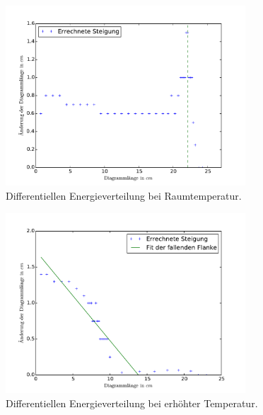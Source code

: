 \begin{figure}[p!]
	\centering
	\includegraphics[width=0.8\textwidth]{Bilder/Vert_kalt_diff.pdf}
	\caption{Differentiellen Energieverteilung bei Raumtemperatur.\cite{matplotlib}}
	\label{fig:E_vert_kalt_diff}
\end{figure}
\begin{figure}[p!]
	\centering
	\includegraphics[width=0.8\textwidth]{Bilder/Vert_warm_diff.pdf}
	\caption{Differentiellen Energieverteilung bei erhöhter Temperatur.\cite{matplotlib}}
	\label{fig:E_vert_warm_diff}
\end{figure}
